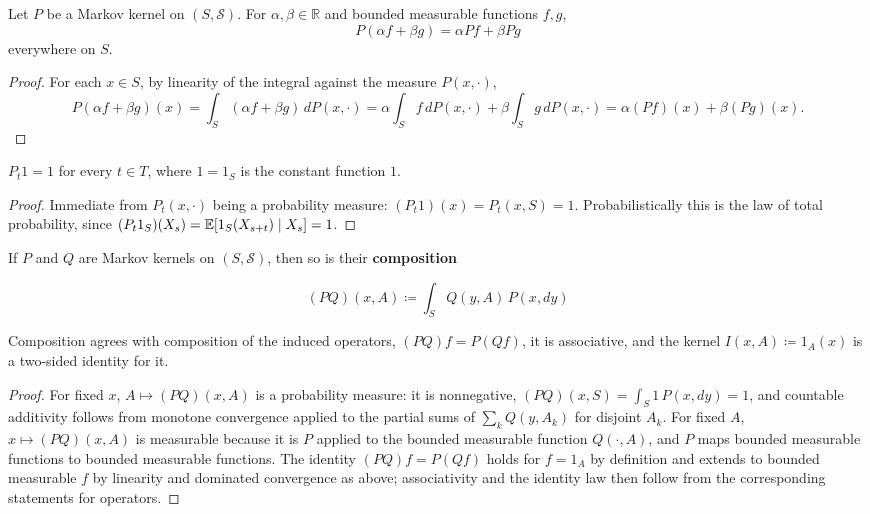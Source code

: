 	\begin{lemma}
		\label{thm:linearity-of-kernel-action}
		Let $P$ be a Markov kernel on $(S, \mathcal{S})$. For $\alpha, \beta \in \mathbb{R}$ and bounded measurable functions $f, g$,
		\begin{equation}
			P(\alpha f + \beta g) = \alpha P f + \beta P g
		\end{equation}
		everywhere on $S$.
	\end{lemma}
	\begin{proof}
		For each $x \in S$, by linearity of the integral against the measure $P(x, \cdot)$,
		\[
			P(\alpha f + \beta g)(x) = \int_S (\alpha f + \beta g) \, dP(x, \cdot) = \alpha \int_S f \, dP(x, \cdot) + \beta \int_S g \, dP(x, \cdot) = \alpha (P f)(x) + \beta (P g)(x).
		\]
	\end{proof}

	\begin{lemma}[Conservativeness]
		\label{thm:conservativeness}
		$P_t 1 = 1$ for every $t \in T$, where $1 = 1_S$ is the constant function $1$.
	\end{lemma}
	\begin{proof}
		Immediate from $P_t(x, \cdot)$ being a probability measure: $(P_t 1)(x) = P_t(x, S) = 1$. Probabilistically this is the law of total probability, since $(P_t 1_S)(X_s) = \operatorname{\mathbb{E}}[1_S (X_{s+t}) \mid X_s] = 1$.
	\end{proof}

	\begin{lemma}
		\label{thm:composition-of-markov-kernels}
		If $P$ and $Q$ are Markov kernels on $(S, \mathcal{S})$, then so is their \textbf{composition}

			\begin{equation}
				(P Q)(x, A) \coloneqq \int_S Q(y, A) \, P(x, dy)
			\end{equation}

		Composition agrees with composition of the induced operators, $(P Q) f = P (Q f)$, it is associative, and the kernel $I(x, A) \coloneqq 1_A (x)$ is a two-sided identity for it.
	\end{lemma}
	\begin{proof}
		For fixed $x$, $A \mapsto (P Q)(x, A)$ is a probability measure: it is nonnegative, $(PQ)(x, S) = \int_S 1 \, P(x, dy) = 1$, and countable additivity follows from monotone convergence applied to the partial sums of $\sum_k Q(y, A_k)$ for disjoint $A_k$. For fixed $A$, $x \mapsto (PQ)(x, A)$ is measurable because it is $P$ applied to the bounded measurable function $Q(\cdot, A)$, and $P$ maps bounded measurable functions to bounded measurable functions. The identity $(PQ)f = P(Qf)$ holds for $f = 1_A$ by definition and extends to bounded measurable $f$ by linearity and dominated convergence as above; associativity and the identity law then follow from the corresponding statements for operators.
	\end{proof}

